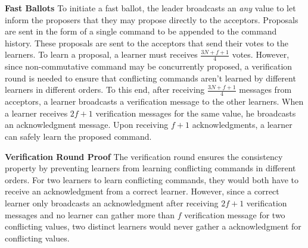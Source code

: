 \textbf{Fast Ballots} To initiate a fast ballot, the leader broadcasts an \textit{any} value to let inform the proposers that they may propose directly to the acceptors. Proposals are sent in the form of a single command to be appended to the command history. These proposals are sent to the acceptors that send their votes to the learners. To learn a proposal, a learner must receives $\frac{3N+f+1}{4}$ votes. However, since non-commutative command may be concurrently proposed, a verification round is needed to ensure that conflicting commands aren't learned by different learners in different orders. To this end, after receiving $\frac{3N+f+1}{4}$ messages from acceptors, a learner broadcasts a verification message to the other learners. When a learner receives $2f+1$ verification messages for the same value, he broadcasts an acknowledgment message. Upon receiving $f+1$ acknowledgments, a learner can safely learn the proposed command. \par
\textbf{Verification Round Proof} The verification round ensures the consistency property by preventing learners from learning conflicting commands in different orders. For two learners to learn conflicting commands, they would both have to receive an acknowledgment from a correct learner. However, since a correct learner only broadcasts an acknowledgment after receiving $2f+1$ verification messages and no learner can gather more than $f$ verification message for two conflicting values, two distinct learners would never gather a acknowledgment for conflicting values.